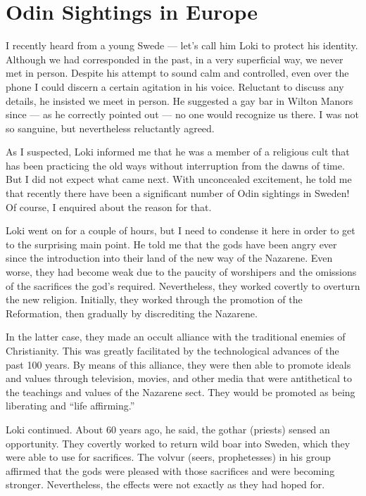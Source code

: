 \section{Odin Sightings in Europe}

I recently heard from a young Swede --- let's call him Loki to protect his identity. Although we had corresponded in the past, in a very superficial way, we never met in person. Despite his attempt to sound calm and controlled, even over the phone I could discern a certain agitation in his voice. Reluctant to discuss any details, he insisted we meet in person. He suggested a gay bar in Wilton Manors since --- as he correctly pointed out --- no one would recognize us there. I was not so sanguine, but nevertheless reluctantly agreed.

As I suspected, Loki informed me that he was a member of a religious cult that has been practicing the old ways without interruption from the dawns of time. But I did not expect what came next. With unconcealed excitement, he told me that recently there have been a significant number of Odin sightings in Sweden! Of course, I enquired about the reason for that.

Loki went on for a couple of hours, but I need to condense it here in order to get to the surprising main point. He told me that the gods have been angry ever since the introduction into their land of the new way of the Nazarene. Even worse, they had become weak due to the paucity of worshipers and the omissions of the sacrifices the god's required. Nevertheless, they worked covertly to overturn the new religion. Initially, they worked through the promotion of the Reformation, then gradually by discrediting the Nazarene.

In the latter case, they made an occult alliance with the traditional enemies of Christianity. This was greatly facilitated by the technological advances of the past 100 years. By means of this alliance, they were then able to promote ideals and values through television, movies, and other media that were antithetical to the teachings and values of the Nazarene sect. They would be promoted as being liberating and ``life affirming.''

Loki continued. About 60 years ago, he said, the gothar (priests) sensed an opportunity. They covertly worked to return wild boar into Sweden, which they were able to use for sacrifices. The volvur (seers, prophetesses) in his group affirmed that the gods were pleased with those sacrifices and were becoming stronger. Nevertheless, the effects were not exactly as they had hoped for.

